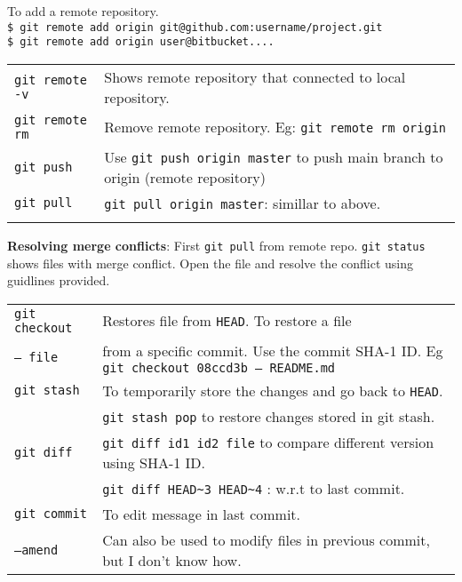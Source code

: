 To add a remote repository.\\
\texttt{\$ git remote add origin git@github.com:username/project.git}\\
\texttt{\$ git remote add origin user@bitbucket....} \\

\begin{tabularx}{\linewidth}{lX}
\texttt{git remote -v} & Shows remote repository that connected to local repository. \\
\texttt{git remote rm} & Remove remote repository. Eg: \texttt{git remote rm origin}\\
\texttt{git push} & Use \texttt{git push origin master} to push main branch to origin (remote repository)\\
\texttt{git pull} & \texttt{git pull origin master}: simillar to above.\\
\hline\\
\end{tabularx}

\textbf{Resolving merge conflicts}: First \texttt{git pull} from remote repo. \texttt{git status} shows files with merge conflict. Open the file and resolve the conflict using guidlines provided. \\

\begin{tabularx}{\linewidth}{lX}
\texttt{git checkout} & Restores file from \texttt{HEAD}. To restore a file\\
\texttt{-- file} & from a specific commit. Use the commit SHA-1 ID. Eg \texttt{git checkout 08ccd3b -- README.md}\\
\texttt{git stash} & To temporarily store the changes and go back to \texttt{HEAD}.\\
 & \texttt{git stash pop} to restore changes stored in git stash.\\
\texttt{git diff} & \texttt{git diff id1 id2 file} to compare different version using SHA-1 ID.\\
 & \texttt{git diff HEAD\~{}3 HEAD\~{}4} : w.r.t to last commit.\\
\texttt{git commit} & To edit message in last commit.\\
\texttt{--amend} & Can also be used to modify files in previous commit, but I don't know how.\\
\hline
\end{tabularx}

